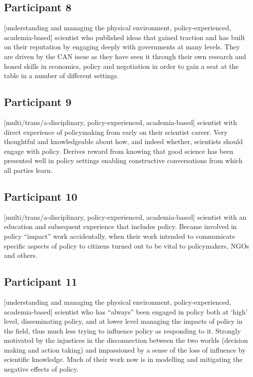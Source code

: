 \subsection{Participant 8}\label{sec:p8}
[understanding and managing the physical environment, policy-experienced, academia-based] scientist who published ideas that gained traction and has built on their reputation by engaging deeply with governments at many levels. They are driven by the  CAN issue as they have seen it through their own research and honed skills in economics, policy and negotiation in order to gain a seat at the table in a number of different settings.

\subsection{Participant 9}\label{sec:p9}
[multi/trans/a-disciplinary, policy-experienced, academia-based] scientist with direct experience of policymaking from early on their scientist career. Very thoughtful and knowledgeable about how, and indeed whether, scientists should engage with policy. Derives reward from knowing that good science has been presented well in policy settings enabling constructive conversations from which all parties learn.

\subsection{Participant 10}\label{sec:p10}
[multi/trans/a-disciplinary, policy-experienced, academia-based] scientist with an education and subsequent experience that includes policy. Became involved in policy ``impact'' work accidentally, when their work intended to communicate specific aspects of policy to citizens turned out to be vital to policymakers, NGOs and others. 

\subsection{Participant 11}\label{sec:p11}
[understanding and managing the physical environment, policy-experienced, academia-based] scientist who has ``always'' been engaged in policy both at `high' level, disseminating policy, and at lower level managing the impacts of policy in the field, thus much less trying to influence policy as responding to it. Strongly motivated by the injustices in the disconnection between the two worlds (decision making and action taking) and impassioned by a sense of the loss of influence by scientific knowledge. Much of their work now is in modelling and mitigating the negative effects of policy. 

